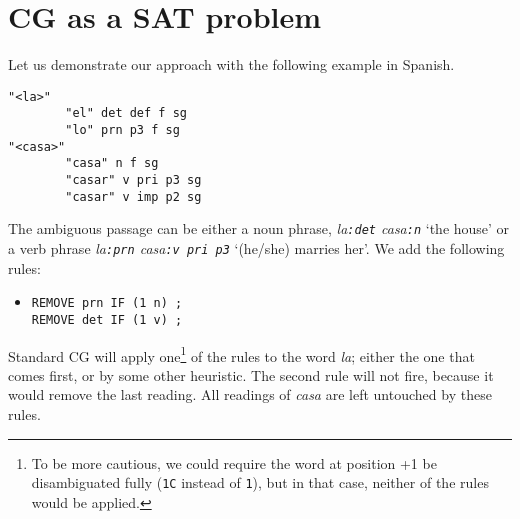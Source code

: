 \documentclass[11pt]{article}
\begin{document}


\section{CG as a SAT problem}
Let us demonstrate our approach with the following example in Spanish.

\begin{verbatim}
"<la>"
        "el" det def f sg
        "lo" prn p3 f sg
"<casa>"
        "casa" n f sg
        "casar" v pri p3 sg
        "casar" v imp p2 sg
\end{verbatim}

The ambiguous passage can be either a noun phrase, \emph{la\texttt{:det} casa\texttt{:n}} 
`the house'  or a verb phrase \emph{la\texttt{:prn} casa\texttt{:v pri p3}} `(he/she) marries her'. 
We add the following rules:

\begin{itemize}
\item [] \texttt{REMOVE prn IF (1 n) ;} \\
             \texttt{REMOVE det IF (1 v) ;}
\end{itemize}

Standard CG will apply one\footnote{To be more cautious, we could require the word at position +1 be disambiguated fully (\texttt{1C} instead of \texttt{1}), but in that case, 
neither of the rules would be applied.} of the rules to the word \emph{la}; 
either the one that comes first, or by some other heuristic. 
The second rule will not fire, because it would remove the last reading. 
All readings of \emph{casa} are left untouched by these rules.
\end{document}

